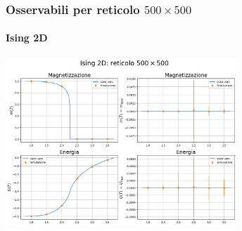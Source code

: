 \begin{frame}
    \frametitle{Osservabili per reticolo $500 \times 500$}
    \framesubtitle{Ising 2D}

    \centering
    \includegraphics[width=0.65\textwidth]{Immagini/backupIsing2D/obs_500.png}

\end{frame}



